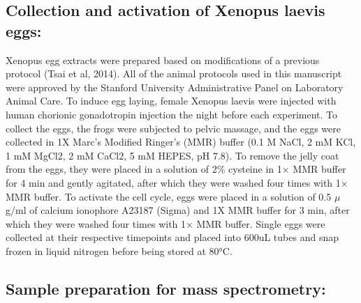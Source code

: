 \documentclass[11pt,]{article}
\begin{document}
\hypertarget{collection-and-activation-of-xenopus-laevis-eggs}{%
\subsection{Collection and activation of Xenopus laevis
eggs:}\label{collection-and-activation-of-xenopus-laevis-eggs}}

Xenopus egg extracts were prepared based on modifications of a previous
protocol (Tsai et al, 2014). All of the animal protocols used in this
manuscript were approved by the Stanford University Administrative Panel
on Laboratory Animal Care. To induce egg laying, female Xenopus laevis
were injected with human chorionic gonadotropin injection the night
before each experiment. To collect the eggs, the frogs were subjected to
pelvic massage, and the eggs were collected in 1X Marc's Modified
Ringer's (MMR) buffer (0.1 M NaCl, 2 mM KCl, 1 mM MgCl2, 2 mM CaCl2, 5
mM HEPES, pH 7.8). To remove the jelly coat from the eggs, they were
placed in a solution of 2\% cysteine in 1× MMR buffer for 4 min and
gently agitated, after which they were washed four times with 1× MMR
buffer. To activate the cell cycle, eggs were placed in a solution of
0.5 \(\mu\)g/ml of calcium ionophore A23187 (Sigma) and 1X MMR buffer
for 3 min, after which they were washed four times with 1× MMR buffer.
Single eggs were collected at their respective timepoints and placed
into 600uL tubes and snap frozen in liquid nitrogen before being stored
at 80°C.

\hypertarget{sample-preparation-for-mass-spectrometry}{%
\subsection{Sample preparation for mass
spectrometry:}\label{sample-preparation-for-mass-spectrometry}}
\end{document}
